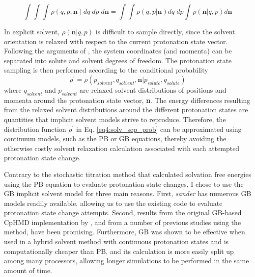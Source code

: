 \begin{equation}
   \int\int\int \rho(q, p, \textbf{n}) dq\;dp\;d\textbf{n} = 
      \int\int\rho(q, p | \textbf{n}) dq\;dp \int \rho(\textbf{n} | q, p)
      d\textbf{n}
   \label{eq4:conditional_probability}
\end{equation}

In explicit solvent, $\rho(\textbf{n} | q, p)$ is difficult to sample directly,
since the solvent orientation is relaxed with respect to the current protonation
state vector. Following the arguments of
\citeauthor{Baptista_JChemPhys_2002_v117_p4184}, the system coordinates (and
momenta) can be separated into solute and solvent degrees of freedom. 
\cite{Baptista_JChemPhys_2002_v117_p4184} The protonation state sampling is then
performed according to the conditional probability
\begin{equation}
   \rho^\prime = \rho(p_{solvent}, q_{solvent}, \textbf{n} | p_{solute},
         q_{solute})
   \label{eq4:solv_sep_prob}
\end{equation}
where $q_{solvent}$ and $p_{solvent}$ are relaxed solvent
distributions of positions and momenta around the protonation state vector,
\textbf{n}. \cite{Baptista_JChemPhys_2002_v117_p4184} The energy differences
resulting from the relaxed solvent distributions around the different
protonation states are quantities that implicit solvent models strive to
reproduce. Therefore, the distribution function $\rho^\prime$ in Eq.
\ref{eq4:solv_sep_prob} can be approximated using continuum models, such as the
PB or GB equations, thereby avoiding the otherwise costly solvent relaxation
calculation associated with each attempted protonation state change.

Contrary to the stochastic titration method that calculated solvation free
energies using the PB equation to evaluate protonation state changes,
\cite{Baptista_JChemPhys_2002_v117_p4184} I chose to use the GB implicit
solvent model for three main reasons. First, \emph{sander} has numerous GB
models readily available, \cite{Hawkins_ChemPhysLett_1995_v246_p122,
Hawkins_JPhysChem_1996_v100_p19824, Onufriev_Proteins_2004_v55_p383,
Mongan_JChemTheoryComput_2007_v3_p156, Shang_JMolGraphics_2011_v29_p676}
allowing us to use the existing code to evaluate protonation state change
attempts.  Second, results from the original GB-based CpHMD implementation by
\citeauthor{Mongan_JComputChem_2004_v25_p2038}, and from a number of
previous studies using the method, have been promising.
\cite{Mongan_JComputChem_2004_v25_p2038, Frantz_JCellBiol_2008_v183_p865,
Williams_JChemTheoryComput_2010_v6_p560, Swails_JChemTheoryComput_2012_v8_p4393}
Furthermore, GB was shown to be effective when used in a hybrid solvent method
with continuous protonation states
\cite{Wallace_JChemTheoryComput_2011_v7_p2617} and is computationally cheaper
than PB, and its calculation is more easily split up among many processors,
allowing longer simulations to be performed in the same amount of time.

